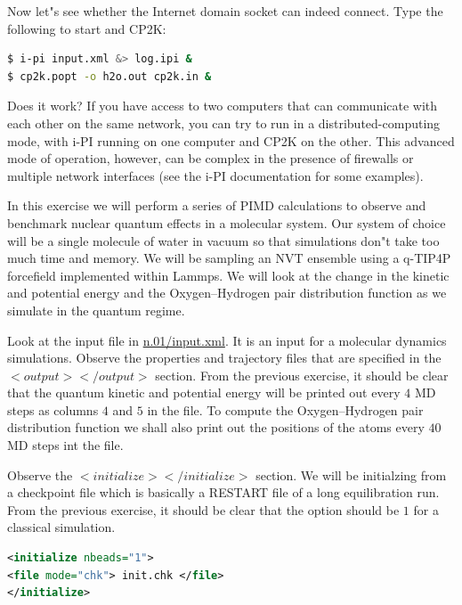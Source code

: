 \documentclass{article}
\begin{document}
\begin{Exercise}[label={inputs},title={Keywords, outputs, and units of \ipi{}}]
\Question
Now let"s see whether the Internet domain socket can indeed connect.
Type the following to start \ipi{} and CP2K:
\begin{lstlisting}[language=bash]
$ i-pi input.xml &> log.ipi &
$ cp2k.popt -o h2o.out cp2k.in &
\end{lstlisting}
Does it work? If you have access to two computers that can communicate with each
other on the same network, you can try to run in a distributed-computing mode,
with i-PI running on one computer and CP2K on the other. This advanced mode of 
operation, however, can be complex in the presence of firewalls or multiple 
network interfaces (see the i-PI documentation for some examples). 

\end{Exercise}

\begin{Exercise}[label={water},title={Benchmark of quantum effects in a water molecule}]
\noindent In this exercise we will perform a series of PIMD calculations to observe and benchmark nuclear quantum effects in a molecular system. Our system of choice will be a single molecule of water in vacuum so that simulations don"t take too much time and memory. We will be sampling an NVT ensemble using a q-TIP4P forcefield implemented within Lammps. We will look at the change in the kinetic and potential energy and the Oxygen--Hydrogen pair distribution function as we simulate in the quantum regime.

\Question
Look at the \ipi{} input file in \url{n.01/input.xml}. It is an \ipi{} input for a molecular dynamics simulations. Observe the 
properties and trajectory files that are specified in the \lstinxml$<output></output>$ section. From the previous exercise, 
it should be clear that the quantum kinetic and potential energy will be printed out every $4$ MD steps as columns $4$ and $5$ in the  file. To compute the Oxygen--Hydrogen pair distribution function we shall also print out the positions of the atoms every $40$ MD steps int the  file.

\Question
Observe the \lstinxml$<initialize></initialize>$ section. We will be initialzing from a checkpoint file 
 which is basically a RESTART file of a long equilibration run. 
From the previous exercise, it should be clear that the option  should be $1$ for a classical simulation.

\begin{lstlisting}[language=xml]
<initialize nbeads="1">  
<file mode="chk"> init.chk </file>
</initialize>
\end{lstlisting}


\end{Exercise}
\end{document}
